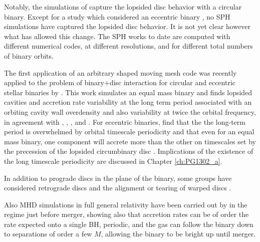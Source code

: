 Notably, the simulations of \cite{RagusaLodato:2016} capture the lopsided disc
behavior with a circular binary. Except for a study which considered an
eccentric binary \citep{Dunhill+2015}, no SPH simulations have captured the
lopsided disc behavior. It is not yet clear however what has allowed this
change. The SPH works to date are computed with different numerical codes, at
different resolutions, and for different total numbers of binary orbits.

The first application of an arbitrary shaped moving mesh code \citep{AREPO}
was recently applied to the problem of binary+disc interaction for circular
and eccentric stellar binaries by \cite{MunozLai:2016}. This work simulates an
equal mass binary and finds lopsided cavities and accretion rate variability
at the long term period associated with an orbiting cavity wall overdensity
and also variability at twice the orbital frequency, in agreement with
\cite{DHM:2013:MNRAS}, \cite{Farris:2014}, \cite{ShiKrolik:2012}, and
\cite{ShiKrolik:2015}. For eccentric binaries, \cite{MunozLai:2016} find that
the the long-term period is overwhelmed by orbital timescale periodicity and
that even for an equal mass binary, one component will accrete more than the
other on timescales set by the precession of the lopsided circumbinary disc
\citep[see also][]{Dunhill+2015}. Implications of the existence of the long
timescale periodicity are discussed in Chapter \ref{ch:PG1302_a}.



In addition to prograde discs in the plane of the binary, some groups have considered retrograde discs \citep{Nixon:2011:LongSim, RoedigSGmigrate:2014, DunhillNixon:2014, BankertShiKrolik:2015, NixonLubow:RetroRes:2015, AmaroSeoane:RetroDiscs:2016} and the alignment or tearing of warped discs \citep{NixonKingPringle:2011, Nixon:CntrAlign:2012, Hayasaki:misalignSims:2013, NixonKing:Tear:2013, DoganNixonKingPrice:2015, Goicovic_I:2016}.

Also MHD simulations in full general relativity have been carried out
by \cite{FarrisLiuShap:2010:Bondi, FarrisShap:2011, FarrisGold:2012,
Gold:GRMHD_CBD:2014, Gold:GRMHD_CBDII:2014} in the regime just before merger,
showing also that accretion rates can be of order the rate expected onto a
single BH, periodic, and the gas can follow the binary down to separations of
order a few $M$, allowing the binary to be bright up until merger.





